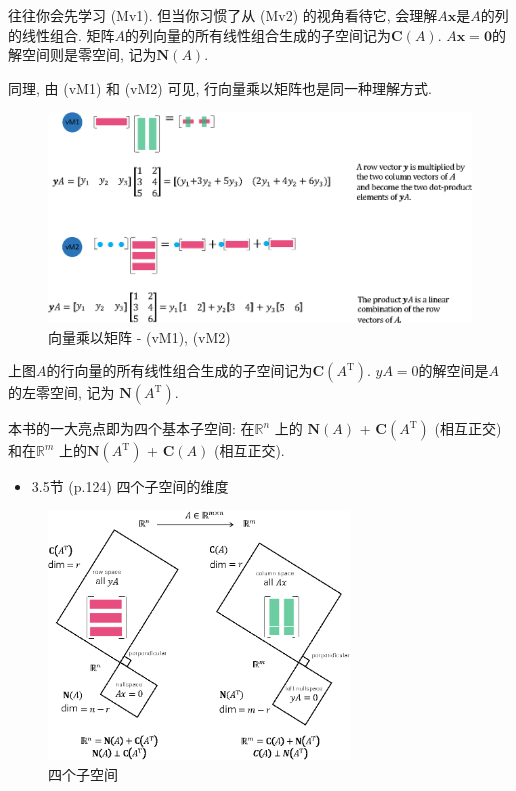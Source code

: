 \documentclass[letterpaper]{article}
\DeclareRobustCommand\transp{^{\mathrm{T}}}
\begin{document}
往往你会先学习 (Mv1). 但当你习惯了从 (Mv2) 的视角看待它, 会理解$A\bm{x}$是$A$的列的线性组合. 
矩阵$A$的列向量的所有线性组合生成的子空间记为$\mathbf{C}(A)$. 
$A\bm{x}=\bm{0}$的解空间则是零空间, 记为$\mathbf{N}(A)$. 


同理, 由 (vM1) 和 (vM2) 可见, 行向量乘以矩阵也是同一种理解方式. 

\begin{figure}[H]
  \centering
  \includegraphics[scale=0.8]{VectorTimesMatrix.eps}
  \caption{向量乘以矩阵 - (vM1), (vM2)}
\end{figure}

上图$A$的行向量的所有线性组合生成的子空间记为$\mathbf{C}(A\transp)$. 
$yA=0$的解空间是$A$的左零空间, 记为 $\mathbf{N}(A\transp)$. 


本书的一大亮点即为四个基本子空间: 在$\mathbb{R}^n$ 上的
$\mathbf{N}(A)$ + $\mathbf{C}(A\transp)$ (相互正交) 
和在$\mathbb{R}^m$ 上的$\mathbf{N}(A\transp)$ + $\mathbf{C}(A)$ (相互正交). 


\begin{itemize}
  \item 3.5节 (p.124) 四个子空间的维度
\end{itemize} 

\begin{figure}[H]
  \centering
  \includegraphics[keepaspectratio, width=8cm]{4-Subspaces.eps}
  \caption{四个子空间}
\end{figure}
\end{document}
